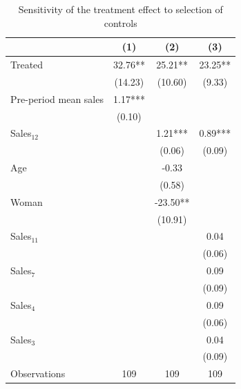 \documentclass[12pt]{article}
\begin{document}
\begin{table}[H]
\centering
\caption{\label{tab:sensitivity} Sensitivity of the treatment effect to selection of controls}
\vspace{-0.3em}

\begin{minipage}{0.9\textwidth}
\centering
\begin{threeparttable}

\begingroup
\small
\renewcommand{\arraystretch}{0.9}
\setlength{\tabcolsep}{12pt}

\setlength{\abovetopsep}{0.35ex}
\setlength{\belowbottomsep}{0.35ex}
\setlength{\aboverulesep}{0.35ex}
\setlength{\belowrulesep}{0.35ex}

\begin{tabular}{lccc}
\toprule
 & (1)  & (2)  & (3) \\
\midrule
Treated   & 32.76** & 25.21** & 23.25** \\
          & (14.23) & (10.60) & (9.33)  \\
Pre-period mean sales & 1.17*** &         &         \\
          & (0.10)  &         &         \\
Sales$_{12}$       &         & 1.21*** & 0.89*** \\
          &         & (0.06)  & (0.09)  \\
Age       &         & -0.33   &         \\
          &         & (0.58)  &         \\
Woman     &         & -23.50**&         \\
          &         & (10.91) &         \\
Sales$_{11}$ &      &         & 0.04    \\
          &         &         & (0.06)  \\
Sales$_7$ &         &         & 0.09    \\
          &         &         & (0.09)  \\
Sales$_4$ &         &         & 0.09    \\
          &         &         & (0.06)  \\
Sales$_3$ &         &         & 0.04    \\
          &         &         & (0.09)  \\
\midrule
Observations & 109 & 109 & 109 \\
\bottomrule
\end{tabular}


\end{threeparttable}
\end{minipage}
\end{table}
\end{document}
